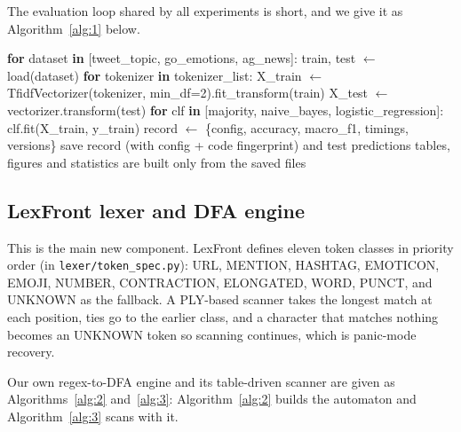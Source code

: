 \documentclass{ieeeaccess}
\begin{document}
The evaluation loop shared by all experiments is short, and we give it as Algorithm~\ref{alg:1} below.

\begin{algorithm}[!tb]
\scriptsize
\caption{Evaluation loop shared by all experiments}\label{alg:1}
\begin{algorithmic}[1]
\State \textbf{for} dataset \textbf{in} [tweet\_topic, go\_emotions, ag\_news]:
\State \hspace*{1.0em}train, test $\leftarrow$ load(dataset)
\State \hspace*{1.0em}\textbf{for} tokenizer \textbf{in} tokenizer\_list:
\State \hspace*{2.0em}X\_train $\leftarrow$ TfidfVectorizer(tokenizer, min\_df=2).fit\_transform(train)
\State \hspace*{2.0em}X\_test  $\leftarrow$ vectorizer.transform(test)
\State \hspace*{2.0em}\textbf{for} clf \textbf{in} [majority, naive\_bayes, logistic\_regression]:
\State \hspace*{3.0em}clf.fit(X\_train, y\_train)
\State \hspace*{3.0em}record $\leftarrow$ \{config, accuracy, macro\_f1, timings, versions\}
\State \hspace*{3.0em}save record (with config + code fingerprint) and test predictions
\State tables, figures and statistics are built only from the saved files
\end{algorithmic}
\end{algorithm}

\subsection{LexFront lexer and DFA engine}\label{sec:3.4}
This is the main new component. LexFront defines eleven token classes in priority order (in \texttt{lexer/\allowbreak{}token\_\allowbreak{}spec.py}): URL, MENTION, HASHTAG, EMOTICON, EMOJI, NUMBER, CONTRACTION, ELONGATED, WORD, PUNCT, and UNKNOWN as the fallback. A PLY-based scanner takes the longest match at each position, ties go to the earlier class, and a character that matches nothing becomes an UNKNOWN token so scanning continues, which is panic-mode recovery.

Our own regex-to-DFA engine and its table-driven scanner are given as Algorithms~\ref{alg:2} and~\ref{alg:3}: Algorithm~\ref{alg:2} builds the automaton and Algorithm~\ref{alg:3} scans with it.
\end{document}
